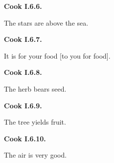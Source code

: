 \par\begin{minipage}{\linewidth}\raggedright
\textbf{Cook I.6.6.}

The stars are above the sea.

\end{minipage}\par\addvspace{4pt}

\par\begin{minipage}{\linewidth}\raggedright
\textbf{Cook I.6.7.}

It is for your food [to you for food].

\end{minipage}\par\addvspace{4pt}

\par\begin{minipage}{\linewidth}\raggedright
\textbf{Cook I.6.8.}

The herb bears seed.

\end{minipage}\par\addvspace{4pt}

\par\begin{minipage}{\linewidth}\raggedright
\textbf{Cook I.6.9.}

The tree yields fruit.

\end{minipage}\par\addvspace{4pt}

\par\begin{minipage}{\linewidth}\raggedright
\textbf{Cook I.6.10.}

The air is very good.

\end{minipage}\par\addvspace{4pt}

